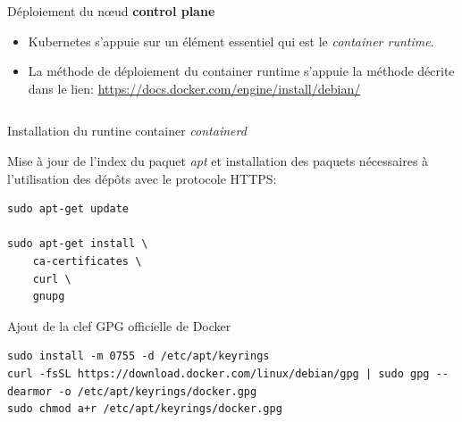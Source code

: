 \begin{frame}[fragile]{Déploiement du n{\oe}ud \textbf{control plane}}

   \begin{itemize}
      \item Kubernetes s'appuie sur un élément essentiel qui est le \textit{container runtime}.
      \item La méthode de déploiement du container runtime s'appuie la méthode décrite dans le lien: \url{https://docs.docker.com/engine/install/debian/}
   \end{itemize}

\begin{tiny}
\begin{Verbatim}[commandchars=\\\{\}]
\end{Verbatim}
\end{tiny}


\end{frame}


\begin{frame}[fragile]{Installation du runtine container \textit{containerd}}

Mise à jour de l'index du paquet \textit{apt} et installation des paquets nécessaires à l'utilisation des dépôts avec le protocole HTTPS:

\begin{tiny}
\begin{Verbatim}[commandchars=\&\#\#]
sudo apt-get update

sudo apt-get install \
    ca-certificates \
    curl \
    gnupg

\end{Verbatim}
\end{tiny}

\end{frame}


\begin{frame}[fragile]{Ajout de la clef GPG officielle de Docker}

\begin{tiny}
\begin{Verbatim}[commandchars=\&\#\#]
sudo install -m 0755 -d /etc/apt/keyrings
curl -fsSL https://download.docker.com/linux/debian/gpg | sudo gpg --dearmor -o /etc/apt/keyrings/docker.gpg
sudo chmod a+r /etc/apt/keyrings/docker.gpg
\end{Verbatim}
\end{tiny}

\end{frame}

